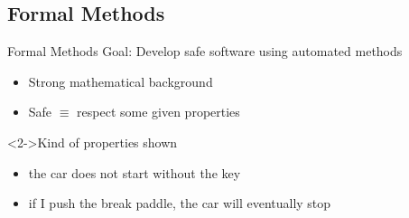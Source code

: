 \subsection{Formal Methods}\subsectionpage
\begin{frame}{Formal Methods}
  \alert{\large Goal:} Develop safe software using automated methods
  \begin{itemize}
  \item Strong mathematical background
  \item<2-> Safe $\equiv$ respect some given properties
  \end{itemize}

  \begin{block}<2->{Kind of properties shown}
    \begin{itemize}
    \item {} the car does not start without the key
    \item {} if I push the break paddle, the car will
      eventually stop
    \end{itemize}
  \end{block}
\end{frame}
